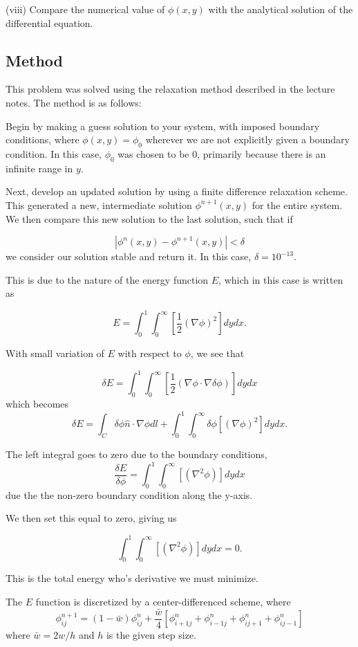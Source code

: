 \documentclass[10pt,letter]{article}
\begin{document}
(viii) Compare the numerical value of $\phi(x, y)$ with the analytical solution of the differential
equation.

\subsection{Method}

This problem was solved using the relaxation method described in the lecture notes. The method is as follows:

Begin by making a guess solution to your system, with imposed boundary conditions, where $\phi(x,y) = \phi_0$ wherever we are not explicitly given a boundary condition. In this case, $\phi_0$ was chosen to be 0, primarily because there is an infinite range in $y$.

Next, develop an updated solution by using a finite difference relaxation scheme. This generated a new, intermediate solution  $\phi^{n+1}(x,y)$ for the entire system. We then compare this new solution to the last solution, such that if

$$|\phi^n(x,y) -\phi^{n+1}(x,y)| < \delta$$ we consider our solution stable and return it. In this case, $\delta=10^{-13}$.

This is due to the nature of the energy function $E$, which in this case is written as 

$$E = \int_0^1\int_0^\infty \left[ \frac{1}{2}(\nabla \phi)^2 \right] dydx.$$

With small variation of $E$ with respect to $\phi$, we see that

$$\delta E = \int_0^1\int_0^\infty \left[ \frac{1}{2}(\nabla \phi \cdot \nabla\delta\phi) \right] dydx$$
which becomes
$$\delta E = \int_C \delta\phi \hat{n}\cdot \nabla \phi dl+ \int_0^1\int_0^\infty \delta\phi\left[ (\nabla \phi)^2 \right] dydx.$$

The left integral goes to zero due to the boundary conditions,
$$\frac{\delta E}{\delta\phi} =  \int_0^1\int_0^\infty \left[ (\nabla^2 \phi) \right] dydx$$
due the the non-zero boundary condition along the y-axis.

We then set this equal to zero, giving us

$$ \int_0^1\int_0^\infty \left[ (\nabla^2 \phi) \right] dydx =0.$$

This is the total energy who's derivative we must minimize.

The $E$ function is discretized by a center-differenced scheme, where
$$\phi_{ij}^{n+1} = (1-\bar{w})\phi^n_{ij} + \frac{\bar{w}}{4}\left[ \phi^n_{i+1j}+\phi^n_{i-1j}+\phi^n_{ij+1}+\phi^n_{ij-1}\right]$$
where $\bar{w} = 2w/h$ and $h$ is the given step size.
\end{document}
